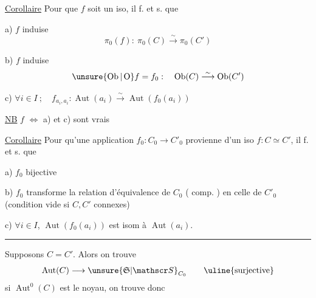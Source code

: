 \uline{Corollaire} Pour que $f$ soit un iso, il f. et s. que

a) $f$ induise
\[
\pi_0(f):\ \pi_0(C)\overset{\sim}{\longrightarrow}\pi_0(C')
\]

b) $f$ induise
\[
\unsure{\operatorname{Ob}|\operatorname{O}}f=f_0:\quad\operatorname{Ob}(C)\overset{\sim}{\longrightarrow}\operatorname{Ob}(C')
\]

c) $\forall i\in I\ ;\quad f_{a_i,a_i}:\operatorname{Aut}(a_i)\overset{\sim}{\longrightarrow}\operatorname{Aut}(f_0(a_i))$

\uline{NB} $f$  $\Longleftrightarrow$ a) et c) sont vrais

\uline{Corollaire} Pour qu'une application $f_0:C_0\longrightarrow C'_0$ provienne d'un iso $f:C\simeq C'$, il f. et s. que

a) $f_0$  bijective

b) $f_0$ transforme la relation d'équivalence de $C_0$ ( comp. ) en celle de $C'_0$ (condition vide si $C,C'$ connexes)

c) $\forall i\in I$, $\operatorname{Aut}(f_0(a_i))$ est isom à $\operatorname{Aut}(a_i)$.

\begin{center}\rule{2em}{0.3pt}\end{center}

 Supposons $C=C'$. Alors on trouve
\[
\operatorname{Aut}(C)\longrightarrow\unsure{\mathfrak S|\mathscr S}_{C_0}\qquad\text{\uline{surjective}}
\]
si $\operatorname{Aut}^0(C)$ est le noyau, on trouve donc
